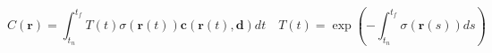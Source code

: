\begin{equation}
    C(\pmb{r}) = \int_{t_n}^{t_f}T(t)\sigma(\pmb{r}(t))\pmb{c}(\pmb{r}(t), \pmb{d})dt \quad T(t) = \exp{\left(-\int_{t_n}^{t_f}\sigma(\pmb{r}(s))ds\right)}
    \label{eq:volume-rendering}
\end{equation}